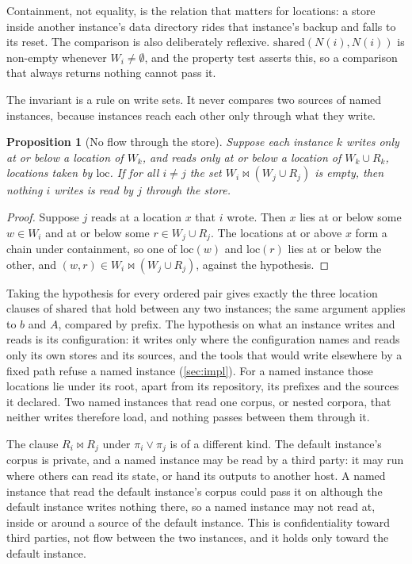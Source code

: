 \documentclass[11pt]{article}
\theoremstyle{plain}
\newtheorem{proposition}[theorem]{Proposition}
\theoremstyle{definition}
\theoremstyle{remark}
\newcommand{\near}{\bowtie}
\newcommand{\shared}{\mathrm{shared}}
\newcommand{\loc}{\mathrm{loc}}
\begin{document}
Containment, not equality, is the relation that matters for locations: a store inside another
instance's data directory rides that instance's backup and falls to its reset. The comparison is
also deliberately reflexive. $\shared(N(i), N(i))$ is non-empty whenever $W_i \neq \emptyset$, and
the property test asserts this, so a comparison that always returns nothing cannot pass it.

The invariant is a rule on write sets. It never compares two sources of named instances, because
instances reach each other only through what they write.

\begin{proposition}[No flow through the store]\label{prop:flow}
Suppose each instance $k$ writes only at or below a location of $W_k$, and reads only at or below a
location of $W_k \cup R_k$, locations taken by $\loc$. If for all $i \neq j$ the set $W_i \near (W_j
\cup R_j)$ is empty, then nothing $i$ writes is read by $j$ through the store.
\end{proposition}
\begin{proof}
Suppose $j$ reads at a location $x$ that $i$ wrote. Then $x$ lies at or below some $w \in W_i$ and at
or below some $r \in W_j \cup R_j$. The locations at or above $x$ form a chain under containment, so
one of $\loc(w)$ and $\loc(r)$ lies at or below the other, and $(w, r) \in W_i \near (W_j \cup R_j)$,
against the hypothesis.
\end{proof}

Taking the hypothesis for every ordered pair gives exactly the three location clauses of $\shared$
that hold between any two instances; the same argument applies to $b$ and $A$, compared by prefix.
The hypothesis on what an instance writes and reads is its configuration: it writes only where the
configuration names and reads only its own stores and its sources, and the tools that would write
elsewhere by a fixed path refuse a named instance (\cref{sec:impl}). For a named instance those
locations lie under its root, apart from its repository, its prefixes and the sources it declared.
Two named instances that read one corpus, or nested corpora, that neither writes therefore load, and
nothing passes between them through it.

The clause $R_i \near R_j$ under $\pi_i \vee \pi_j$ is of a different kind. The default instance's
corpus is private, and a named instance may be read by a third party: it may run where others can
read its state, or hand its outputs to another host. A named instance that read the default
instance's corpus could pass it on although the default instance writes nothing there, so a named
instance may not read at, inside or around a source of the default instance. This is
confidentiality toward third parties, not flow between the two instances, and it holds only toward
the default instance.
\end{document}
